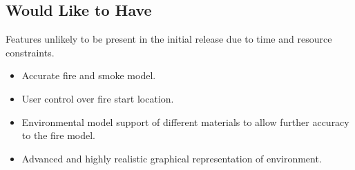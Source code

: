 \subsection{Would Like to Have}

Features unlikely to be present in the initial release due to time
and resource constraints.
\begin{itemize}
\item Accurate fire and smoke model.
\item User control over fire start location.
\item Environmental model support of different materials to allow further
accuracy to the fire model.
\item Advanced and highly realistic graphical representation of environment.\end{itemize}

